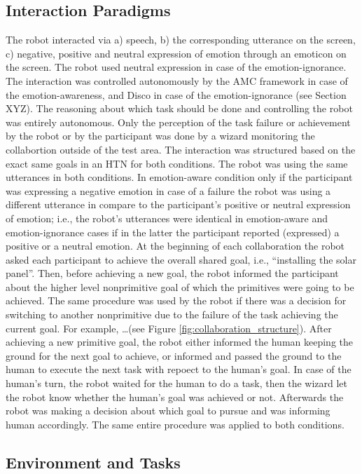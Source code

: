 \documentclass{sig-alternate-05-2015}
\begin{document}
\subsection{Interaction Paradigms}
\label{sec-interaction-paradigms}
The robot interacted via a) speech, b) the corresponding utterance on the
screen, c) negative, positive and neutral expression of emotion through an
emoticon on the screen. The robot used neutral expression in case of the
emotion-ignorance. The interaction was controlled autonomously by the AMC
framework in case of the emotion-awareness, and Disco in case of the
emotion-ignorance (see Section XYZ). The reasoning about which task should be
done and controlling the robot was entirely autonomous. Only the perception of
the task failure or achievement by the robot or by the participant was done by a
wizard monitoring the collabortion outside of the test area. The interaction was
structured based on the exact same goals in an HTN for both conditions. The
robot was using the same utterances in both conditions. In emotion-aware
condition only if the participant was expressing a negative emotion in case of a
failure the robot was using a different utterance in compare to the
participant's positive or neutral expression of emotion; i.e., the robot's
utterances were identical in emotion-aware and emotion-ignorance cases if in the
latter the participant reported (expressed) a positive or a neutral emotion. At
the beginning of each collaboration the robot asked each participant to achieve
the overall shared goal, i.e., ``installing the solar panel''. Then, before
achieving a new goal, the robot informed the participant about the higher level
nonprimitive goal of which the primitives were going to be achieved. The same
procedure was used by the robot if there was a decision for switching to another
nonprimitive due to the failure of the task achieving the current goal. For
example, \ldots (see Figure \ref{fig:collaboration_structure}). After achieving
a new primitive goal, the robot either informed the human keeping the ground for
the next goal to achieve, or informed and passed the ground to the human to
execute the next task with repoect to the human's goal. In case of the human's
turn, the robot waited for the human to do a task, then the wizard let the robot
know whether the human's goal was achieved or not. Afterwards the robot was
making a decision about which goal to pursue and was informing human
accordingly. The same entire procedure was applied to both conditions.

\subsection{Environment and Tasks}
\end{document}
